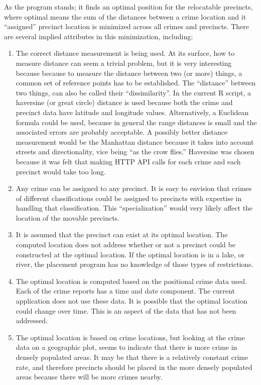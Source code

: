As the program stands; it finds an optimal position for the relocatable precincts, where optimal means the sum of the distances between a crime location and it ``assigned'' precinct location is minimized across all crimes and precincts.  There are several implied attributes in this minimization, including:
\begin{enumerate}
\item The correct distance measurement is being used.  At its surface, how to measure distance can seem a trivial problem, but it is very interesting because because to measure the distance between two (or more) things, a common set of reference points has to be established.  The ``distance'' between two things, can also be called their ``dissimilarity''\cite{deza2009encyclopedia}.  In the current R script, a haversine (or great circle) distance is used because both the crime and precinct data have latitude and longitude values.  Alternatively, a Euclidean formula could be used, because in general the range distances is small and the associated errors are probably acceptable.  A possibly better distance measurement would be the Manhattan distance because it takes into account streets and directionality, vice being ``as the crow flies.''  Haversine was chosen because it was felt that making HTTP API calls for each crime and each precinct would take too long.
\item Any crime can be assigned to any precinct.  It is easy to envision that crimes of different classifications could be assigned to precincts with expertise in handling that classification.  This ``specialization'' would very likely affect the location of the movable precincts.
\item It is assumed that the precinct can exist at its optimal location.  The computed location does not address whether or not a precinct could be constructed at the optimal location.  If the optimal location is in a lake, or river, the placement program has no knowledge of those types of restrictions.
\item The optimal location is computed based on the positional crime data used.  Each of the crime reports has a time and date component.  The current application does not use these data.  It is possible that the optimal location could change over time.  This is an aspect of the data that has not been addressed.
\item The optimal location is based on crime locations, but looking at the crime data on a geographic plot, seems to indicate that there is more crime in densely populated areas.  It may be that there is a relatively constant crime rate, and therefore precincts should be placed in the more densely populated areas because there will be more crimes nearby.

\end{enumerate}

